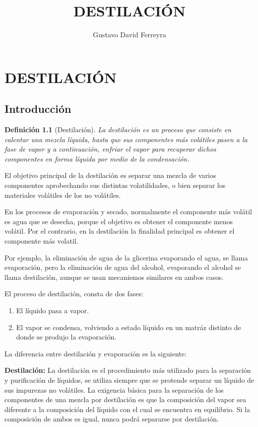 \documentclass[11pt,openany]{book}
\title{DESTILACIÓN}
\author{Gustavo David Ferreyra}
\newtheorem{defi}{Definición}
\begin{document}

\newpage\null\thispagestyle{empty}
\newpage\tableofcontents{\thispagestyle{empty}}
\newpage\setcounter{page}{1}
\chapter{DESTILACIÓN}
\section{Introducción}
\begin{defi}[Destilación]
La destilación es un proceso que consiste en calentar una mezcla líquida, hasta que sus componentes más 
volátiles pasen a la fase de vapor y a continuación, enfriar el vapor para recuperar dichos 
componentes en forma líquida por medio de la condensación.
\end{defi}

El objetivo principal de la destilación es separar una mezcla de varios componentes aprobechando 
sus distintas volatilidades, o bien separar los materiales volátiles de los no volátiles.

En los procesos de evaporación y secado, normalmente el componente más volátil es agua que se desecha, porque el objetivo es obtener 
el componente menos volátil. Por el contrario, en la destilación la finalidad principal es obtener el componente más volatil.

Por ejemplo, la eliminación de agua de la glicerina evaporando el agua, se llama evaporación, pero 
la eliminación de agua del alcohol, evaporando el alcohol se llama destilación, aunque se usan 
mecanismos similares en ambos casos.

El proceso de destilación, consta de dos fases:
\begin{enumerate}
\item El líquido pasa a vapor. 
\item El vapor se condensa, volviendo a estado líquido en un matráz distinto de donde se produjo la evaporación.
\end{enumerate}
La diferencia entre destilación y evaporación es la siguiente:


\textbf{Destilación:} La destilación es el procedimiento más utilizado para la separación y purificación de 
líquidos, se utiliza siempre  que se protende separar un líquido de sus impurezas no volátiles.
La exigencia básica para la separación de los componentes de una mezcla por destilación es que la 
composición del vapor sea diferente a la composición del líquido con el cual se encuentra en equilibrio. Si 
la composición de ambos es igual, nunca podrá separarse por destilación.
\end{document}
